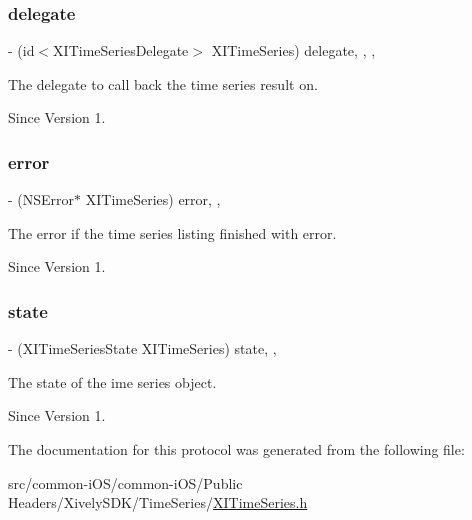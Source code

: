 \subsubsection{\texorpdfstring{delegate}{delegate}}
{\footnotesize\ttfamily -\/ (id$<$X\+I\+Time\+Series\+Delegate$>$ X\+I\+Time\+Series) delegate\hspace{0.3cm}{\ttfamily [read]}, {\ttfamily [write]}, {\ttfamily [nonatomic]}, {\ttfamily [weak]}}



The delegate to call back the time series result on. 

\begin{DoxySince}{Since}
Version 1. 
\end{DoxySince}
\hypertarget{protocol_x_i_time_series_01-p_a17dae744d476350328a52d2a65e10708}{}\label{protocol_x_i_time_series_01-p_a17dae744d476350328a52d2a65e10708} 
\subsubsection{\texorpdfstring{error}{error}}
{\footnotesize\ttfamily -\/ (N\+S\+Error$\ast$ X\+I\+Time\+Series) error\hspace{0.3cm}{\ttfamily [read]}, {\ttfamily [nonatomic]}, {\ttfamily [assign]}}



The error if the time series listing finished with error. 

\begin{DoxySince}{Since}
Version 1. 
\end{DoxySince}
\hypertarget{protocol_x_i_time_series_01-p_a069ed984107bc2fb781ca7c09629a855}{}\label{protocol_x_i_time_series_01-p_a069ed984107bc2fb781ca7c09629a855} 
\subsubsection{\texorpdfstring{state}{state}}
{\footnotesize\ttfamily -\/ (X\+I\+Time\+Series\+State X\+I\+Time\+Series) state\hspace{0.3cm}{\ttfamily [read]}, {\ttfamily [nonatomic]}, {\ttfamily [assign]}}



The state of the ime series object. 

\begin{DoxySince}{Since}
Version 1. 
\end{DoxySince}


The documentation for this protocol was generated from the following file\+:\begin{DoxyCompactItemize}
\item 
src/common-\/i\+O\+S/common-\/i\+O\+S/\+Public Headers/\+Xively\+S\+D\+K/\+Time\+Series/\hyperlink{_x_i_time_series_8h}{X\+I\+Time\+Series.\+h}\end{DoxyCompactItemize}
